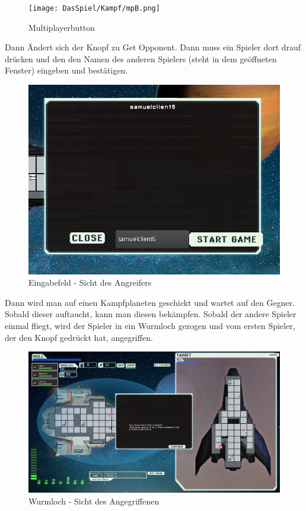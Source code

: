 \documentclass[fontsize=12pt,paper=a4,twoside]{scrartcl}
\begin{document}
\begin{figure}[H]
\centering
\texttt{[image: DasSpiel/Kampf/mpB.png]}
\caption{Multiplayerbutton}
\end{figure}

 Dann Ändert sich der Knopf zu Get Opponent. Dann muss ein Spieler dort drauf drücken und den den Namen des anderen Spielers (steht in dem geöffneten Fenster) eingeben und bestätigen.

\begin{figure}[H]
\centering
\includegraphics[width=0.8\linewidth]{DasSpiel/Kampf/join.png}
\caption{Eingabefeld - Sicht des Angreifers}
\end{figure}
 
 Dann wird man auf einen Kampfplaneten geschickt und wartet auf den Gegner. Sobald dieser auftaucht, kann man diesen bekämpfen. Sobald der andere Spieler einmal fliegt, wird der Spieler in ein Wurmloch gezogen und vom ersten Spieler, der den Knopf gedrückt hat, angegriffen. 

\begin{figure}[H]
\centering
\includegraphics[width=0.8\linewidth]{DasSpiel/Kampf/wurmloch.png}
\caption{Wurmloch - Sicht des Angegriffenen}
\end{figure}
\end{document}

